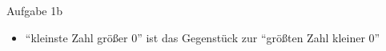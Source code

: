 \begin{frame}{Aufgabe 1b}
    \begin{solutionnoinc}
        \begin{itemize}
            \item \enquote{kleinste Zahl größer $0$} ist das Gegenstück zur \enquote{größten Zahl kleiner $0$}
        \end{itemize}
    \end{solutionnoinc}
\end{frame}
